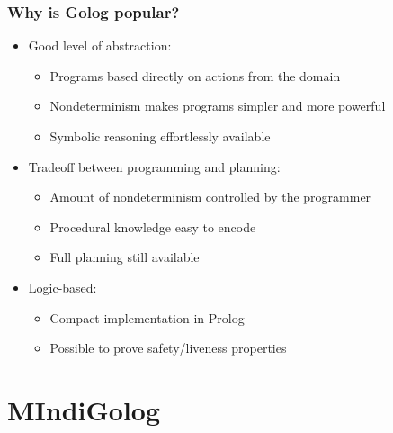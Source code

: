 \documentclass{beamer}
\begin{document}
\begin{frame}
\frametitle{Why is Golog popular?}
\begin{itemize}
  \item Good level of abstraction:
  \begin{itemize}
    \item Programs based directly on actions from the domain
    \item Nondeterminism makes programs simpler and more powerful
    \item Symbolic reasoning effortlessly available
  \end{itemize}
  \item Tradeoff between programming and planning:
  \begin{itemize}
    \item Amount of nondeterminism controlled by the programmer
    \item Procedural knowledge easy to encode
    \item Full planning still available
  \end{itemize}
  \item Logic-based:
  \begin{itemize}
    \item Compact implementation in Prolog
    \item Possible to prove safety/liveness properties
  \end{itemize}
\end{itemize}
\end{frame}


\section{MIndiGolog}
\end{document}
